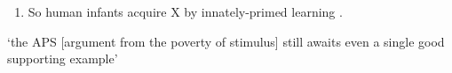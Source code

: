 \documentclass[12pt]{extarticle}
\begin{document}
\begin{multicols}{3}
\begin{enumerate}
\item

So human infants acquire X by innately-primed learning .

\end{enumerate}

‘the APS [argument from the poverty of stimulus] still awaits even a single good supporting example’
\citep[p.\ 47]{pullum:2002_empirical}






\footnotesize


\end{multicols}
\end{document}
